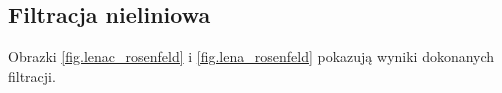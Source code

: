 \documentclass{classrep}
\begin{document}
\subsection{Filtracja nieliniowa}
Obrazki \ref{fig.lenac_rosenfeld} i \ref{fig.lena_rosenfeld} pokazują wyniki dokonanych filtracji.

\begin{figure}
\end{figure}
\end{document}
